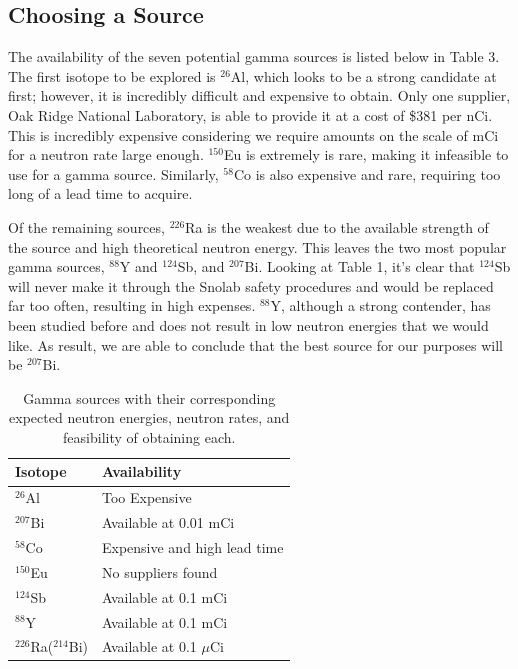 \documentclass[%
12pt,
twoside,
reprint,
amsmath,amssymb,
aps,
]{article}
\begin{document}
	\subsection{Choosing a Source}
	\par The availability of the seven potential gamma sources is listed below in Table 3. The first isotope to be explored is $^{26}$Al, which looks to be a strong candidate at first; however, it is incredibly difficult and expensive to obtain. Only one supplier, Oak Ridge National Laboratory, is able to provide it at a cost of \$381 per nCi. This is incredibly expensive considering we require amounts on the scale of mCi for a neutron rate large enough. $^{150}$Eu is extremely is rare, making it infeasible to use for a gamma source. Similarly, $^{58}$Co is also expensive and rare, requiring too long of a lead time to acquire.
	\par Of the remaining sources, $^{226}$Ra is the weakest due to the available strength of the source and high theoretical neutron energy. This leaves the two most popular gamma sources, $^{88}$Y and $^{124}$Sb, and $^{207}$Bi. Looking at Table 1, it's clear that $^{124}$Sb will never make it through the Snolab safety procedures and would be replaced far too often, resulting in high expenses. $^{88}$Y, although a strong contender, has been studied before and does not result in low neutron energies that we would like. As result, we are able to conclude that the best source for our purposes will be $^{207}$Bi.
	\begin{table}
		\begin{center}
			\scriptsize
			\begin{tabular}{p{3.1cm} p{4cm}}
				\hline
				\textbf{Isotope} & \textbf{Availability} \\ \hline
				$^{26}$Al & Too Expensive \\ \hline
				$^{207}$Bi & Available at 0.01 mCi \\ \hline
				$^{58}$Co & Expensive and high lead time \\ \hline
				$^{150}$Eu & No suppliers found \\ \hline
				$^{124}$Sb & Available at 0.1 mCi \\ \hline
				$^{88}$Y & Available at 0.1 mCi \\ \hline
				$^{226}$Ra($^{214}$Bi) & Available at 0.1 $\mu$Ci \\ \hline
			\end{tabular}
			\caption{Gamma sources with their corresponding expected neutron energies, neutron rates, and feasibility of obtaining each.}
		\end{center}
	\end{table}
	
\end{document}

